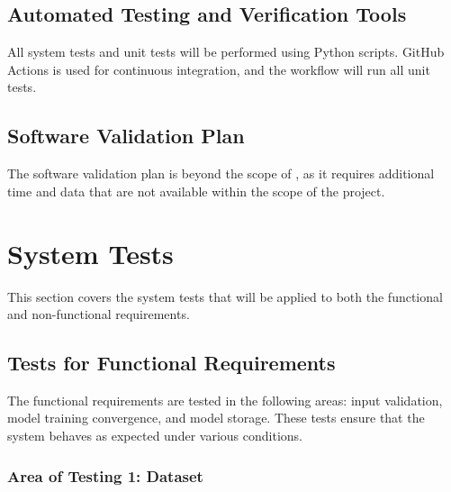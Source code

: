 \documentclass[12pt, titlepage]{article}
\begin{document}
\subsection{Automated Testing and Verification Tools}
All system tests and unit tests will be performed using Python scripts.  
GitHub Actions is used for continuous integration, and the workflow will run all unit tests.

\subsection{Software Validation Plan}

The software validation plan is beyond the scope of \progname, as it requires additional time and data that are not available within the scope of the project.

\section{System Tests}\label{SystemTest}

This section covers the system tests that will be applied to both the functional and non-functional requirements.

\subsection{Tests for Functional Requirements}

The functional requirements are tested in the following areas: input validation, model training convergence, and model storage. These tests ensure that the system behaves as expected under various conditions.

\subsubsection{Area of Testing 1: Dataset}
\end{document}
